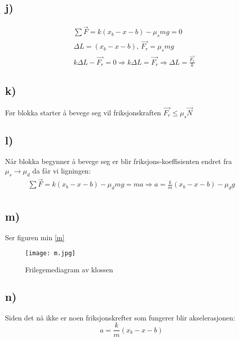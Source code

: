 \documentclass[a4paper,12pt,norsk]{article}
\begin{document}
\subsection*{j)}
\begin{align*}
&\sum \vec{F} = k(x_b-x-b) - \mu_s mg = 0\\
&\Delta{L} = (x_b-x-b)\textrm{, } \vec{F_r} = \mu_s mg \\
&k\Delta{L} -\vec{F_r} = 0 \Rightarrow k\Delta{L} = \vec{F_r} \Rightarrow \Delta{L} = \frac{\vec{F_r}}{k}
\end{align*}

\subsection*{k)}
Før blokka starter å bevege seg vil friksjonskraften $\vec{F_r} \leq \mu_s\vec{N}$

\subsection*{l)}
Når blokka begynner å bevege seg er blir friksjons-koeffisienten endret fra $\mu_s \rightarrow \mu_d$ da får vi ligningen:
\begin{align*}
\sum \vec{F} = k(x_b-x-b) - \mu_d mg = ma \Rightarrow a = \frac{k}{m}(x_b-x-b) - \mu_dg\\
\end{align*}

\subsection*{m)}
Ser figuren min \vref{m}

\begin{figure}[h!]
\texttt{[image: m.jpg]} 
\caption{Frilegemediagram av klossen}
\label{m}
\end{figure} 


\subsection*{n)}
Siden det nå ikke er noen friksjonskrefter som fungerer blir akselerasjonen:
$$a = \frac{k}{m}(x_b-x-b)$$
\end{document}
